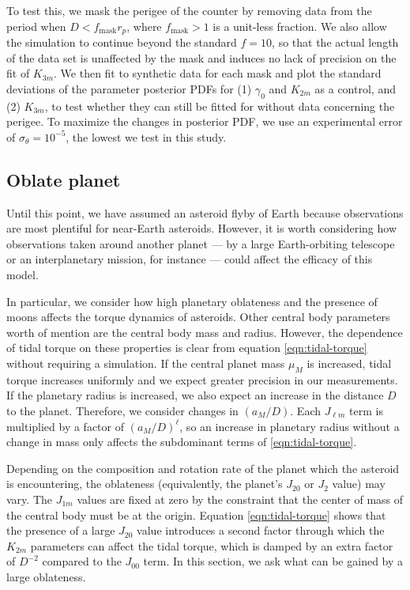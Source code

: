 \documentclass{aastex631}
\begin{document}
To test this, we mask the perigee of the counter by removing data from the period when $D < f_\textrm{mask} r_p$, where $f_\textrm{mask}>1$ is a unit-less fraction. We also allow the simulation to continue beyond the standard $f = 10$, so that the actual length of the data set is unaffected by the mask and induces no lack of precision on the fit of $K_{3m}$. We then fit to synthetic data for each mask and plot the standard deviations of the parameter posterior PDFs for (1) $\gamma_0$ and $K_{2m}$ as a control, and (2) $K_{3m}$, to test whether they can still be fitted for without data concerning the perigee. To maximize the changes in posterior PDF, we use an experimental error of $\sigma_\theta = 10^{-5}$, the lowest we test in this study.


\subsection{Oblate planet}


Until this point, we have assumed an asteroid flyby of Earth because observations are most plentiful for near-Earth asteroids. However, it is worth considering how observations taken around another planet --- by a large Earth-orbiting telescope or an interplanetary mission, for instance --- could affect the efficacy of this model.

In particular, we consider how high planetary oblateness and the presence of moons affects the torque dynamics of asteroids. Other central body parameters worth of mention are the central body mass and radius. However, the dependence of tidal torque on these properties is clear from equation \ref{eqn:tidal-torque} without requiring a simulation. If the central planet mass $\mu_M$ is increased, tidal torque increases uniformly and we expect greater precision in our measurements. If the planetary radius is increased, we also expect an increase in the distance $D$ to the planet. Therefore, we consider changes in $(a_M/D)$. Each $J_{\ell m}$ term is multiplied by a factor of $(a_M/D)^\ell$, so an increase in planetary radius without a change in mass only affects the subdominant terms of \ref{eqn:tidal-torque}.

Depending on the composition and rotation rate of the planet which the asteroid is encountering, the oblateness (equivalently, the planet's $J_{20}$ or $J_2$ value) may vary. The $J_{1m}$ values are fixed at zero by the constraint that the center of mass of the central body must be at the origin. Equation \ref{eqn:tidal-torque} shows that the presence of a large $J_{20}$ value introduces a second factor through which the $K_{2m}$ parameters can affect the tidal torque, which is damped by an extra factor of $D^{-2}$ compared to the $J_{00}$ term. In this section, we ask what can be gained by a large oblateness.
\end{document}
